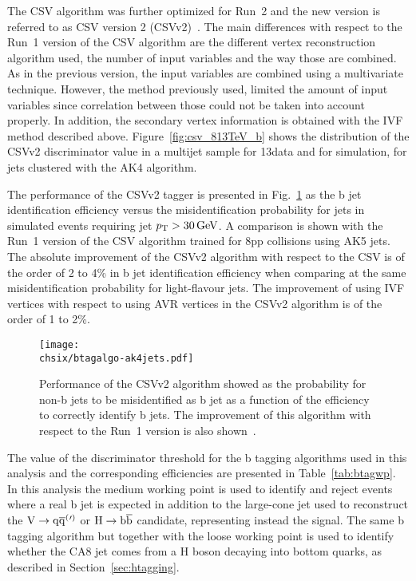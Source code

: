 The CSV algorithm was further optimized for Run~2 and the new version is referred to as CSV version 2 (CSVv2)~\cite{CMS-PAS-BTV-15-001}. The main differences with respect to the Run~1 version of the CSV algorithm are the different vertex reconstruction algorithm used, the number of input variables and the way those are combined. As in the previous version, the input variables are combined using a multivariate technique. However, the method previously used, limited the amount of input variables since correlation between those could not be taken into account properly. In addition, the secondary vertex information is obtained with the IVF method described above. Figure~\ref{fig:csv_813TeV_b} shows the distribution of the CSVv2 discriminator value in a multijet sample for 13\TeV data and for simulation, for jets clustered with the AK4 algorithm.

The performance of the CSVv2 tagger is presented in Fig.~\ref{fig:btagalgo} as the b jet identification efficiency versus the misidentification probability for jets in simulated \ttbar events requiring jet $p_{\mathrm{T}} > 30\,\text{Ge\hspace{-.08em}V}$. A comparison is shown with the Run~1 version of the CSV algorithm trained for 8\TeV pp collisions using AK5 jets. The absolute improvement of the CSVv2 algorithm with respect to the CSV is of the order of 2 to 4\% in b jet identification efficiency when comparing at the same misidentification probability for light-flavour jets. The improvement of using IVF vertices with respect to using AVR vertices in the CSVv2 algorithm is of the order of 1 to 2\%.\\

\begin{figure}[!htb]
 \begin{center}
  \texttt{[image: \\chsix/btagalgo-ak4jets.pdf]}
 \end{center}
 \caption{Performance of the CSVv2 algorithm showed as the probability for non-b jets to be misidentified as b jet as a function of the efficiency to correctly identify b jets. The improvement of this algorithm with respect to the Run~1 version is also shown~\cite{CMS-PAS-BTV-15-001}.}
 \label{fig:btagalgo}
\end{figure}

The value of the discriminator threshold for the b tagging algorithms used in this analysis and the corresponding efficiencies are presented in Table~\ref{tab:btagwp}.
In this analysis the medium working point is used to identify and reject \ttbar events where a real b jet is expected in addition to the large-cone jet used to reconstruct the $\mathrm{V}\to\mathrm{q}\overline{\mathrm{q}}^({}'^){}$ or $\mathrm{H}\to{\mathrm{b}\overline{\mathrm{b}}}$ candidate, representing instead the signal. The same b tagging algorithm but together with the loose working point is used to identify whether the CA8 jet comes from a H boson decaying into bottom quarks, as described in Section~\ref{sec:htagging}.

